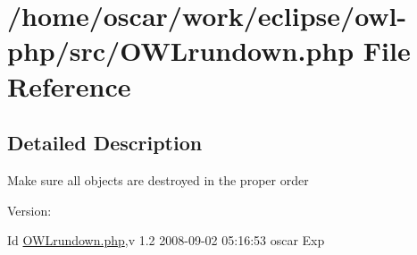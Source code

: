 \hypertarget{OWLrundown_8php}{
\section{/home/oscar/work/eclipse/owl-php/src/OWLrundown.php File Reference}
\label{OWLrundown_8php}
}


\subsection{Detailed Description}
Make sure all objects are destroyed in the proper order \begin{Desc}
\item[Version:]\end{Desc}
\begin{Desc}
\item[Id]\hyperlink{OWLrundown_8php}{OWLrundown.php},v 1.2 2008-09-02 05:16:53 oscar Exp \end{Desc}
